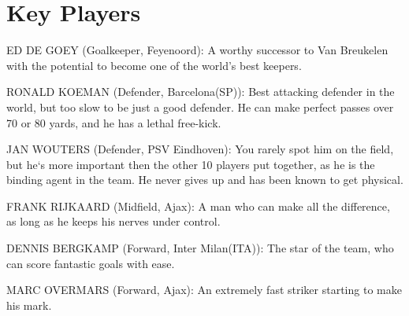 \section{Key Players}
ED DE GOEY (Goalkeeper, Feyenoord):
A worthy successor to Van Breukelen with the potential to become one of the
world's best keepers.

RONALD KOEMAN (Defender, Barcelona(SP)): 
Best attacking defender in the world, but too slow to be just a good defender.
He can make perfect passes over 70 or 80 yards, and he has a lethal free-kick.

JAN WOUTERS (Defender, PSV Eindhoven): 
You rarely spot him on the field, but he`s more important then the other 10 
players put together, as he is the binding agent in the team. He never gives up 
and has been known to get physical.

FRANK RIJKAARD (Midfield, Ajax):
A man who can make all the difference, as long as he keeps his nerves under 
control.

DENNIS BERGKAMP (Forward, Inter Milan(ITA)):
The star of the team, who can score fantastic goals with ease.

MARC OVERMARS (Forward, Ajax):
An extremely fast striker starting to make his mark.
